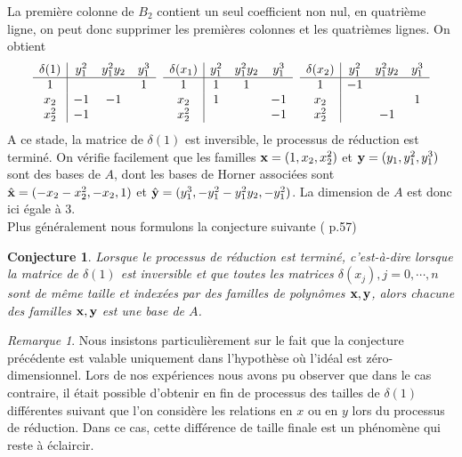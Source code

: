 \documentclass{article}
\theoremstyle{plain}%
\newtheorem{conj}{Conjecture}
\theoremstyle{definition}
\theoremstyle{remark}
\newtheorem*{rem}{Remarque}
\begin{document}
La première colonne de $B_2$ contient un seul coefficient non nul, en quatrième ligne, on peut donc supprimer les premières colonnes et les quatrièmes lignes. On obtient\\

$$
\begin{array}{c|ccc}
	\delta(1) & y_1^2 & y_1^2y_2 & y_1^3 \\
	\hline
	1  &  &  & 1 \\
	x_2  & -1 & -1 & \\
	x_2^2 & -1 &  & 
\end{array} 
\hspace{0.2cm} 
\begin{array}{c|ccc}
	\delta(x_1) & y_1^2 & y_1^2y_2 & y_1^3 \\
	\hline
	1  & 1 & 1 & \\
	x_2  & 1 &  & -1\\
	x_2^2  &  &  & -1 
\end{array}
\hspace{0.2cm} 
\begin{array}{c|ccc}
	\delta(x_2) & y_1^2 & y_1^2y_2 & y_1^3 \\
	\hline
	1  & -1 &  & \\
	x_2  &  &  & 1 \\
	x_2^2  &  & -1 & 
\end{array}
$$
A ce stade, la matrice de $\delta(1)$ est inversible, le processus de réduction est terminé. On vérifie facilement que les familles $\bold{x} = (1, x_2, x_2^{2})$ et $\bold{y} = (y_1, y_1^{2}, y_1^{3})$ sont des bases de $A$, dont les bases de Horner associées sont $\hat{\bold{x}} = (-x_2-x_2^{2}, -x_{2}, 1)$ et $\hat{\bold{y}} = (y_1^{3}, -y_1^{2}-y_1^{2}y_2, -y_1^{2})$. La dimension de $A$ est donc ici égale à $3$.\\

Plus généralement nous formulons la conjecture suivante (\cite{jpc} p.57)
\begin{conj}
Lorsque le processus de réduction est terminé, c'est-à-dire lorsque la matrice de $\delta(1)$ est inversible et que toutes les matrices $\delta(x_j), j=0, \cdots, n$ sont de même taille et indexées par des familles de polynômes $\bold{x, y}$, alors chacune des familles $\bold{x, y}$ est une base de $A$.
\end{conj}

\begin{rem}
Nous insistons particulièrement sur le fait que la conjecture précédente est valable uniquement dans l'hypothèse où l'idéal est zéro-dimensionnel. Lors de nos expériences nous avons pu observer que dans le cas contraire, il était possible d'obtenir en fin de processus des tailles de $\delta(1)$ différentes suivant que l'on considère les relations en $x$ ou en $y$ lors du processus de réduction. Dans ce cas, cette différence de taille finale est un phénomène qui reste à éclaircir.
\end{rem}
\end{document}
